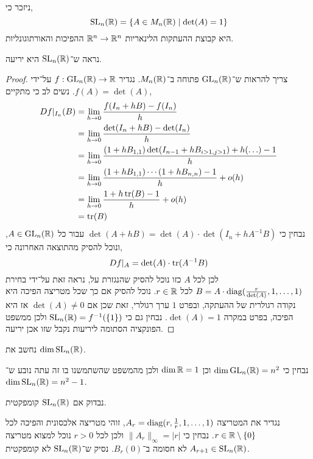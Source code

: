 \question{}
ניזכר כי,
\[
	\operatorname{SL}_n(\mathbb{R})
	= \{ A \in M_n(\mathbb{R}) \mid \det(A) = 1 \}
\]
היא קבוצת ההעתקות הלינאריות $\mathbb{R}^n \to \mathbb{R}^n$ ההפיכות והאורתוגונליות.

\subquestion{}
נראה ש־$\operatorname{SL}_n(\mathbb{R})$ היא יריעה.
\begin{proof}
	צריך להראות ש־$\operatorname{GL}_n(\mathbb{R})$ פתוחה ב־$M_n(\mathbb{R})$.
	נגדיר $f : \operatorname{GL}_n(\mathbb{R}) \to \mathbb{R}$ על־ידי $f(A) = \det(A)$.
	נשים לב כי מתקיים,
	\begin{align*}
		D f |_{I_n}(B)
		& = \lim_{h \to 0} \frac{f(I_n + h B) - f(I_n)}{h} \\
		& = \lim_{h \to 0} \frac{\det(I_n + h B) - \det(I_n)}{h} \\
		& = \lim_{h \to 0} \frac{(1 + h B_{1, 1}) \det(I_{n - 1} + h B_{i > 1, j > 1}) + h(\ldots) - 1}{h} \\
		& = \lim_{h \to 0} \frac{(1 + h B_{1, 1}) \cdots (1 + h B_{n, n}) - 1}{h} + o(h) \\
		& = \lim_{h \to 0} \frac{1 + h \operatorname{tr}(B) - 1}{h} + o(h) \\
		& = \operatorname{tr}(B)
	\end{align*}
	נבחין כי $\det(A + h B) = \det(A) \cdot \det(I_n + h A^{-1} B)$ עבור כל $A \in \operatorname{GL}_n(\mathbb{R})$, ונוכל להסיק מהתוצאה האחרונה כי,
	\[
		D f |_{A}
		= \det(A) \cdot \operatorname{tr}(A^{-1} B)
	\]
	לכן לכל $A$ כזו נוכל להסיק שהנגזרת על, נראה זאת על־ידי בחירת $B = A \cdot \operatorname{diag}(\frac{r}{\det(A)}, 1, \ldots, 1)$ לכל $r \in \mathbb{R}$.
	נוכל להסיק אם כך שכל מטריצה הפיכה היא נקודה רגולרית של ההעתקה, ובפרט $1$ ערך רגולרי, זאת שכן אם $\det(A) \ne 0$ אז היא הפיכה, בפרט במקרה $\det(A) = 1$.
	נבחין גם כי $\operatorname{SL}_n(\mathbb{R}) = f^{-1}(\{1\})$ ולכן ממשפט הפונקציה הסתומה ליריעות נקבל שזו אכן יריעה.
\end{proof}

\subquestion{}
נחשב את $\dim \operatorname{SL}_n(\mathbb{R})$.
\begin{solution}
	נבחין כי $\dim \operatorname{GL}_n(\mathbb{R}) = n^2$ וכן $\dim \mathbb{R} = 1$ ולכן מהמשפט שהשתמשנו בו זה עתה נובע ש־$\dim \operatorname{SL}_n(\mathbb{R}) = n^2 - 1$.
\end{solution}

\subquestion{}
נבדוק אם $\operatorname{SL}_n(\mathbb{R})$ קומפקטית.
\begin{solution}
	נגדיר את המטריצה $A_r = \operatorname{diag}(r, \frac{1}{r}, 1, \ldots, 1)$, זוהי מטריצה אלכסונית והפיכה לכל $r \in \mathbb{R} \setminus \{ 0 \}$.
	נבחין כי $\lVert A_r \rVert_\infty = |r|$ ולכן לכל $r > 0$ נוכל למצוא מטריצה $A_{r + 1} \in \operatorname{SL}_n(\mathbb{R})$ לא חסומה ב־$B_r(0)$.
	נסיק ש־$\operatorname{SL}_n(\mathbb{R})$ לא קומפקטית.
\end{solution}

